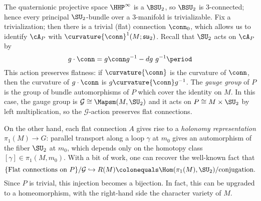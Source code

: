 The quaternionic projective space $\HHP^\infty$ is a $\BSU_2$, so $\BSU_2$ is $3$-connected; hence every principal
$\SU_2$-bundle over a $3$-manifold is trivializable. Fix a trivialization; then there is a trivial (flat)
connection $\conn_0$, which allows us to identify $\cA_P$ with $\curvature{\conn}^1(M; \mathfrak{su}_2)$. Recall
that $\SU_2$ acts on $\cA_P$ by
\[g\cdot \conn =g\conn g^{-1}-dg\ g^{-1}\period\]
This action preserves flatness: if $\curvature{\conn}$ is the curvature of $\conn$, then the curvature of $g\cdot\conn$ is
$g\curvature{\conn} g^{-1}$. The \textit{gauge group} of $P$ is the group of bundle automorphisms of $P$ which cover the
identity on $M$. In this case, the gauge group is
$\mathcal{G}\cong\Mapsm(M,\SU_2)$ and it acts on $P\cong M\times \SU_2$ by left multiplication, so the
$\mathcal{G}$-action preserves flat connections.

On the other hand, each flat connection $A$  gives rise to a \textit{holonomy representation} $\pi_1(M)\rightarrow
G$: parallel transport along a loop $\gamma$ at $m_0$ gives an automorphism of the fiber $\SU_2$ at $m_0$, which
depends only on the homotopy class $[\gamma]\in\pi_1(M,m_0)$. With a bit of work, one can recover the well-known fact that 
\begin{equation}
	\{\text{Flat connections on }P\}/\mathcal{G}\hookrightarrow R(M) \colonequals\Hom(\pi_1(M),\SU_2)/\text{conjugation}.
\end{equation}
Since $P$ is trivial, this injection becomes a bijection. In fact, this can be upgraded to a homeomorphism, with
the right-hand side the character variety of $M$.

